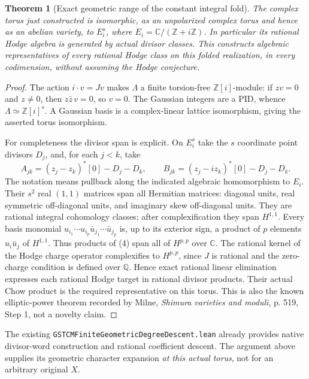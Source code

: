 \documentclass[11pt]{article}
\newtheorem{theorem}{Theorem}
\newcommand{\Q}{\mathbb Q}
\newcommand{\Z}{\mathbb Z}
\newcommand{\C}{\mathbb C}
\begin{document}
\begin{theorem}[Exact geometric range of the constant integral fold]
The complex torus just constructed is isomorphic, as an unpolarized
complex torus and hence as an abelian variety, to $E_i^s$, where
$E_i=\C/(\Z+i\Z)$. In particular its rational Hodge algebra is generated
by actual divisor classes. This constructs algebraic representatives
of every rational Hodge class on this folded realization, in every
codimension, without assuming the Hodge conjecture.
\end{theorem}
\begin{proof}
The action $i\cdot v=Jv$ makes $\Lambda$ a finite torsion-free
$\Z[i]$-module: if $zv=0$ and $z\ne0$, then
$z\bar z\,v=0$, so $v=0$. The Gaussian integers are a PID, whence
$\Lambda\simeq\Z[i]^s$. A Gaussian basis is a complex-linear lattice
isomorphism, giving the asserted torus isomorphism.

For completeness the divisor span is explicit. On $E_i^s$ take the $s$
coordinate point divisors $D_j$, and, for each $j<k$, take
\[
 A_{jk}=(z_j-z_k)^*[0]-D_j-D_k,\qquad
 B_{jk}=(z_j-i z_k)^*[0]-D_j-D_k.                 \tag{4}
\]
The notation means pullback along the indicated algebraic homomorphism
to $E_i$. Their $s^2$ real $(1,1)$ matrices span all Hermitian matrices:
diagonal units, real symmetric off-diagonal units, and imaginary
skew off-diagonal units. They are rational integral cohomology classes;
after complexification they span $H^{1,1}$.
Every basis monomial $u_{i_1}\cdots u_{i_p}
\bar u_{j_1}\cdots\bar u_{j_p}$ is, up to its exterior sign, a product
of $p$ elements $u_i\bar u_j$ of $H^{1,1}$.
Thus products of (4) span all of $H^{p,p}$ over $\C$.
The rational kernel of the Hodge charge operator complexifies to
$H^{p,p}$, since $J$ is rational and the zero-charge condition is
defined over $\Q$. Hence exact rational linear elimination expresses
each rational Hodge target in rational divisor products. Their actual
Chow product is the required representative on this torus.
This is also the known elliptic-power theorem recorded by Milne,
\emph{Shimura varieties and moduli}, p. 519, Step 1, not a novelty claim.
\end{proof}

The existing \texttt{GSTCMFiniteGeometricDegreeDescent.lean} already
provides native divisor-word construction and rational coefficient
descent. The argument above supplies its geometric character expansion
\emph{at this actual torus}, not for an arbitrary original $X$.
\end{document}
